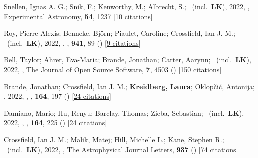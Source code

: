 \item[{\color{numcolor}\scriptsize75}] Snellen, Ignas A. G.; Snik, F.; Kenworthy, M.; Albrecht, S.; \etal\ (incl.\ \textbf{LK}), 2022, , Experimental Astronomy, \textbf{54}, 1237 [\href{https://ui.adsabs.harvard.edu/abs/2022ExA....54.1237S}{10 citations}]

\item[{\color{numcolor}\scriptsize74}] Roy, Pierre-Alexis; Benneke, Bj{\"o}rn; Piaulet, Caroline; Crossfield, Ian J. M.; \etal\ (incl.\ \textbf{LK}), 2022, , \apj, \textbf{941}, 89 () [\href{https://ui.adsabs.harvard.edu/abs/2022ApJ...941...89R}{9 citations}]

\item[{\color{numcolor}\scriptsize73}] Bell, Taylor; Ahrer, Eva-Maria; Brande, Jonathan; Carter, Aarynn; \etal\ (incl.\ \textbf{LK}), 2022, , The Journal of Open Source Software, \textbf{7}, 4503 () [\href{https://ui.adsabs.harvard.edu/abs/2022JOSS....7.4503B}{150 citations}]

\item[{\color{numcolor}\scriptsize72}] Brande, Jonathan; Crossfield, Ian J. M.; \textbf{Kreidberg, Laura}; Oklop{\v{c}}i{\'c}, Antonija; \etal, 2022, , \aj, \textbf{164}, 197 () [\href{https://ui.adsabs.harvard.edu/abs/2022AJ....164..197B}{24 citations}]

\item[{\color{numcolor}\scriptsize71}] Damiano, Mario; Hu, Renyu; Barclay, Thomas; Zieba, Sebastian; \etal\ (incl.\ \textbf{LK}), 2022, , \aj, \textbf{164}, 225 () [\href{https://ui.adsabs.harvard.edu/abs/2022AJ....164..225D}{24 citations}]

\item[{\color{numcolor}\scriptsize70}] Crossfield, Ian J. M.; Malik, Matej; Hill, Michelle L.; Kane, Stephen R.; \etal\ (incl.\ \textbf{LK}), 2022, , The Astrophysical Journal Letters, \textbf{937} () [\href{https://ui.adsabs.harvard.edu/abs/2022ApJ...937L..17C}{74 citations}]

